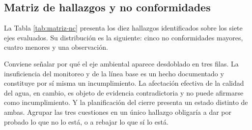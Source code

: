 \subsection{Matriz de hallazgos y no conformidades}

La Tabla \ref{tab:matriz-nc} presenta los diez hallazgos identificados sobre los
siete ejes evaluados. Su distribución es la siguiente: cinco no conformidades
mayores, cuatro menores y una observación.

Conviene señalar por qué el eje ambiental aparece desdoblado en tres filas. La
insuficiencia del monitoreo y de la línea base es un hecho documentado y
constituye por sí misma un incumplimiento. La afectación efectiva de la calidad
del agua, en cambio, es objeto de evidencia contradictoria y no puede afirmarse
como incumplimiento. Y la planificación del cierre presenta un estado distinto de
ambas. Agrupar las tres cuestiones en un único hallazgo obligaría a dar por
probado lo que no lo está, o a rebajar lo que sí lo está.

